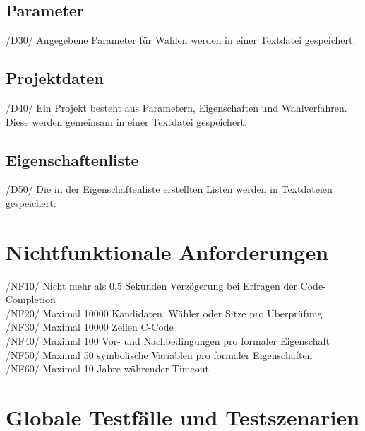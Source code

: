 \documentclass[a4paper]{scrreprt}
\begin{document}
\section{Parameter}
/D30/ Angegebene Parameter für Wahlen werden in einer Textdatei gespeichert. \\


\section{Projektdaten}
/D40/ Ein Projekt besteht aus Parametern, Eigenschaften und Wahlverfahren. Diese werden gemeinsam in einer Textdatei gespeichert. \\

\section{Eigenschaftenliste}
/D50/ Die in der Eigenschaftenliste erstellten Listen werden in Textdateien gespeichert. \\

\chapter{Nichtfunktionale Anforderungen}
/NF10/ Nicht mehr als 0,5 Sekunden Verzögerung bei Erfragen der Code-Completion \\
/NF20/ Maximal 10000 Kandidaten, Wähler oder Sitze pro Überprüfung \\
/NF30/ Maximal 10000 Zeilen C-Code \\
/NF40/ Maximal 100 Vor- und Nachbedingungen pro formaler Eigenschaft \\
/NF50/ Maximal 50 symbolische Variablen pro formaler Eigenschaften \\
/NF60/ Maximal 10 Jahre währender Timeout \\


\chapter{Globale Testfälle und Testszenarien}
\end{document}
